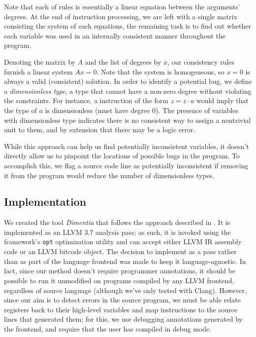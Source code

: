 \documentclass[12pt]{article}
\begin{document}
Note that each of rules is essentially a linear equation between the arguments' degrees.
At the end of instruction processing, we are left with a single matrix consisting the system of such equations, the remaining task is to find out whether each variable was used in an internally consistent manner throughout the program.

Denoting the matrix by $A$ and the list of degrees by $x$, our consistency rules furnish a linear system $Ax = 0$.
Note that the system is homogeneous, so $x = 0$ is always a valid (consistent) solution.
In order to identify a potential bug, we define a \textit{dimensionless type}, a type that cannot have a non-zero degree without violating the constraints.
For instance, a instruction of the form $z = z \cdot a$ would imply that the type of $a$ is dimensionless (must have degree 0).
The presence of variables with dimensionless type indicates there is no consistent way to assign a nontrivial unit to them, and by extension that there may be a logic error.

While this approach can help us find potentially inconsistent variables, it doesn't directly allow us to pinpoint the locations of possible bugs in the program.
To accomplish this, we flag a source code line as potentially inconsistent if removing it from the program would reduce the number of dimensionless types.

\subsection{Implementation}

We created the tool \textit{Dimentia} that follows the approach described in .
It is implemented as an LLVM 3.7 analysis pass; as such, it is invoked using the framework's \texttt{opt} optimization utility and can accept either LLVM IR assembly code or an LLVM bitcode object.
The decision to implement as a pass rather than as part of the language frontend was made to keep it language-agnostic.
In fact, since our method doesn't require programmer annotations, it should be possible to run it unmodified on programs compiled by any LLVM frontend, regardless of source language (although we've only tested with Clang).
However, since our aim is to detect errors in the source program, we must be able relate registers back to their high-level variables and map instructions to the source lines that generated them; for this, we use debugging annotations generated by the frontend, and require that the user has compiled in debug mode.
\end{document}
